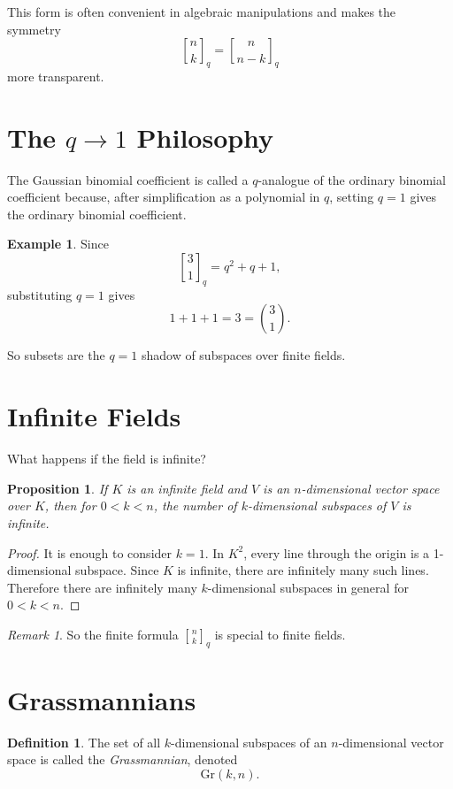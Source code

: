 \documentclass[11pt]{article}
\newtheorem{proposition}[theorem]{Proposition}
\theoremstyle{definition}
\newtheorem{definition}[theorem]{Definition}
\newtheorem{example}[theorem]{Example}
\theoremstyle{remark}
\newtheorem{remark}[theorem]{Remark}
\newcommand{\Gr}{\mathrm{Gr}}
\newcommand{\qbinom}[2]{\genfrac{[}{]}{0pt}{}{#1}{#2}_q}
\begin{document}
	This form is often convenient in algebraic manipulations and makes the symmetry
	\[
	\qbinom{n}{k}=\qbinom{n}{n-k}
	\]
	more transparent.
	
	\section{The \(q\to 1\) Philosophy}
	
	The Gaussian binomial coefficient is called a \(q\)-analogue of the ordinary binomial coefficient because, after simplification as a polynomial in \(q\), setting \(q=1\) gives the ordinary binomial coefficient.
	
	\begin{example}
		Since
		\[
		\qbinom{3}{1}=q^2+q+1,
		\]
		substituting \(q=1\) gives
		\[
		1+1+1=3=\binom{3}{1}.
		\]
	\end{example}
	
	So subsets are the \(q=1\) shadow of subspaces over finite fields.
	
	\section{Infinite Fields}
	
	What happens if the field is infinite?
	
	\begin{proposition}
		If \(K\) is an infinite field and \(V\) is an \(n\)-dimensional vector space over \(K\), then for \(0<k<n\), the number of \(k\)-dimensional subspaces of \(V\) is infinite.
	\end{proposition}
	
	\begin{proof}
		It is enough to consider \(k=1\). In \(K^2\), every line through the origin is a 1-dimensional subspace. Since \(K\) is infinite, there are infinitely many such lines. Therefore there are infinitely many \(k\)-dimensional subspaces in general for \(0<k<n\).
	\end{proof}
	
	\begin{remark}
		So the finite formula \(\qbinom{n}{k}\) is special to finite fields.
	\end{remark}
	
	\section{Grassmannians}
	
	\begin{definition}
		The set of all \(k\)-dimensional subspaces of an \(n\)-dimensional vector space is called the \emph{Grassmannian}, denoted
		\[
		\Gr(k,n).
		\]
	\end{definition}
	
\end{document}
